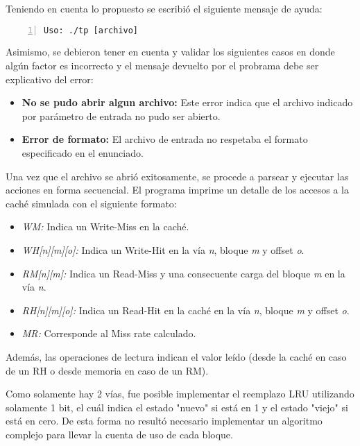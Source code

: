 \documentclass[11pt,a4paper, spanish]{article}
\begin{document}
Teniendo en cuenta lo propuesto se escribi\'o el siguiente mensaje de ayuda:

\begin{lstlisting}[numbers=left, tabsize=2, basicstyle=\fontsize{11}{13}\ttfamily, frame=single, caption={Mensaje de ayuda del programa}]
Uso: ./tp [archivo]
\end{lstlisting}

Asimismo, se debieron tener en cuenta y validar los siguientes casos en donde alg\'un factor es incorrecto y el mensaje devuelto por el probrama debe ser explicativo del error:

\begin{itemize}
\item \textbf{No se pudo abrir algun archivo:} Este error indica que el archivo indicado por parámetro de entrada no pudo ser abierto.
\item \textbf{Error de formato:} El archivo de entrada no respetaba el formato especificado en el enunciado.
\end{itemize}

Una vez que el archivo se abrió exitosamente, se procede a parsear y ejecutar las acciones en forma secuencial.
El programa imprime un detalle de los accesos a la caché simulada con el siguiente formato:

\begin{itemize}
\item \textit{WM:} Indica un Write-Miss en la caché.
\item \textit{WH[n][m][o]:} Indica un Write-Hit en la vía \textit{n}, bloque \textit{m} y offset \textit{o}.
\item \textit{RM[n][m]:} Indica un Read-Miss y una consecuente carga del bloque \textit{m} en la vía \textit{n}.
\item \textit{RH[n][m][o]:} Indica un Read-Hit en la caché en la vía \textit{n}, bloque \textit{m} y offset \textit{o}.
\item \textit{MR:} Corresponde al Miss rate calculado.
\end{itemize}

Además, las operaciones de lectura indican el valor leído (desde la caché en caso de un RH o desde memoria en caso de un RM).

Como solamente hay 2 vías, fue posible implementar el reemplazo LRU utilizando solamente 1 bit, el cuál indica
el estado "nuevo" si está en 1 y el estado "viejo" si está en cero. De esta forma no resultó necesario implementar
un algoritmo complejo para llevar la cuenta de uso de cada bloque.
\end{document}
